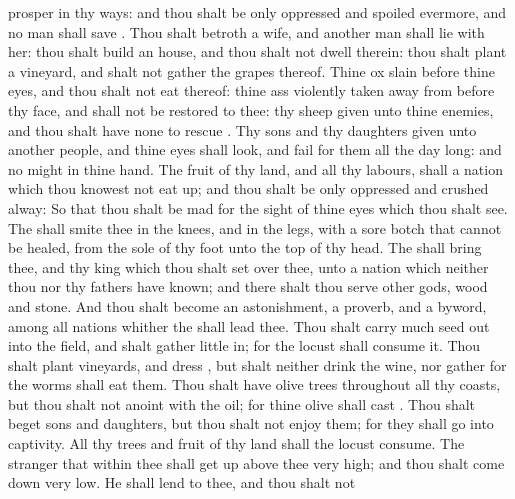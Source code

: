 {prosper in thy
ways: and thou shalt be only
oppressed and
spoiled
evermore, and no man shall
save
{}.
Thou shalt
betroth a
wife, and
another
man shall
lie with her: thou shalt
build an
house, and thou shalt not
dwell therein: thou shalt
plant a
vineyard, and shalt not gather the
grapes thereof.
Thine
ox
{}
slain before thine
eyes, and thou shalt not
eat thereof: thine
ass
{} violently taken
away from before thy
face, and shall not be
restored to thee: thy
sheep
{}
given unto thine
enemies, and thou shalt have none to
rescue
{}.
Thy
sons and thy
daughters
{}
given unto
another
people, and thine
eyes shall
look, and
fail
{} for them all the
day long: and
{} no
might in thine
hand.
The
fruit of thy
land, and all thy
labours, shall a
nation which thou
knowest not eat
up; and thou shalt be only
oppressed and
crushed
alway:
So that thou shalt be
mad for the
sight of thine
eyes which thou shalt
see.
The
{} shall
smite thee in the
knees, and in the
legs, with a
sore
botch that
cannot be
healed, from the
sole of thy
foot unto the top of thy
head.
The
{} shall
bring thee, and thy
king which thou shalt
set over thee, unto a
nation which neither thou nor thy
fathers have
known; and there shalt thou
serve
other
gods,
wood and
stone.
And thou shalt become an
astonishment, a
proverb, and a
byword, among all
nations whither the
{} shall
lead thee.
Thou shalt
carry
much
seed
out into the
field, and shalt
gather
{}
little
in; for the
locust shall
consume it.
Thou shalt
plant
vineyards, and
dress
{}, but shalt neither
drink
{} the
wine, nor
gather
{} for the
worms shall
eat them.
Thou shalt have olive
trees throughout all thy
coasts, but thou shalt not
anoint
{} with the
oil; for thine
olive shall
cast
{}.
Thou shalt
beget
sons and
daughters, but thou shalt not enjoy them; for they shall
go into
captivity.
All thy
trees and
fruit of thy
land shall the
locust
consume.
The
stranger that
{}
within thee shall get
up above thee
very
high; and thou shalt come
down
very
low.
He shall
lend to thee, and thou shalt not
}
